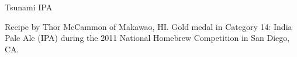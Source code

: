\documentclass[parskip=half,fontsize=9pt,oneside]{scrbook}
\begin{document}
\mainmatter


\begin{recipe}{Tsunami IPA} %

\begin{aboutblock}
Recipe by Thor McCammon of Makawao, HI. Gold medal in Category 14: India Pale Ale
(IPA) during the 2011 National Homebrew Competition in San Diego, CA.
\sourceaha
\end{aboutblock}


\begin{methodandtiming}

\begin{mashsteps}
\end{mashsteps}

\begin{fermentationsteps}
\end{fermentationsteps}

\end{methodandtiming}

\recipebreak

\begin{ingredientsblock}

\begin{malts}
\end{malts}

\begin{hops}
\end{hops}


\end{ingredientsblock}

\end{recipe}


\end{document}
